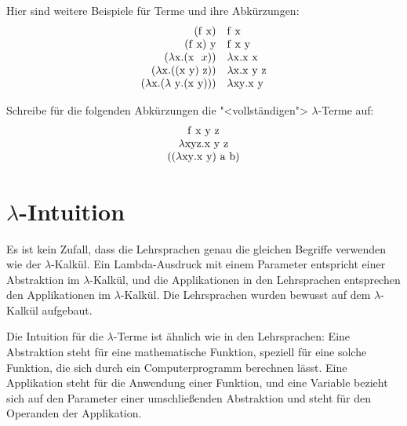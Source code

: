 Hier sind weitere Beispiele für Terme und ihre Abkürzungen:
%
\begin{displaymath}
  \begin{array}{rl}
    (\mathrm f~\mathrm x) &  \mathrm f~\mathrm x\\
    (\mathrm f~\mathrm x)~\mathrm y & \mathrm f~\mathrm x~\mathrm y\\
    (\lambda \mathrm x.(\mathrm x~\mathrm~x)) & \lambda \mathrm x.\mathrm x~\mathrm x\\
    (\lambda \mathrm x.((\mathrm x~\mathrm y)~\mathrm z)) & \lambda \mathrm x.\mathrm
                                                x~\mathrm y~\mathrm z\\
    (\lambda \mathrm x.(\lambda~\mathrm y.(\mathrm x~\mathrm y))) & \lambda \mathrm x\mathrm y.\mathrm x~\mathrm y
  \end{array}
\end{displaymath}
%
\begin{aufgabe}
  Schreibe für die folgenden Abkürzungen die "<vollständigen">
  $\lambda$-Terme auf:
\begin{displaymath}
  \begin{array}{c}
    \mathrm f~\mathrm x~\mathrm y~\mathrm z\\
    \lambda \mathrm x\mathrm y\mathrm z.\mathrm x~\mathrm y~\mathrm z\\
    ((\lambda \mathrm x\mathrm y.\mathrm x~\mathrm y)~\mathrm a~\mathrm b)
  \end{array}
\end{displaymath}
\end{aufgabe}

\section{$\lambda$-Intuition}

Es ist kein Zufall, dass die Lehrsprachen genau die gleichen Begriffe verwenden
wie der $\lambda$-Kalkül.  Ein Lambda-Ausdruck mit einem
Parameter entspricht einer Abstraktion im $\lambda$-Kalkül,
und die Applikationen in den Lehrsprachen entsprechen den Applikationen im
$\lambda$-Kalkül.  Die Lehrsprachen wurden bewusst auf dem
$\lambda$-Kalkül aufgebaut.

Die Intuition für die $\lambda$-Terme ist ähnlich wie in
den Lehrsprachen: Eine Abstraktion steht für eine mathematische Funktion,
speziell für eine solche Funktion, die sich durch ein Computerprogramm
berechnen lässt.  Eine Applikation steht für
die Anwendung einer Funktion, und eine Variable bezieht sich auf den
Parameter einer umschließenden Abstraktion und steht für den Operanden
der Applikation.  


